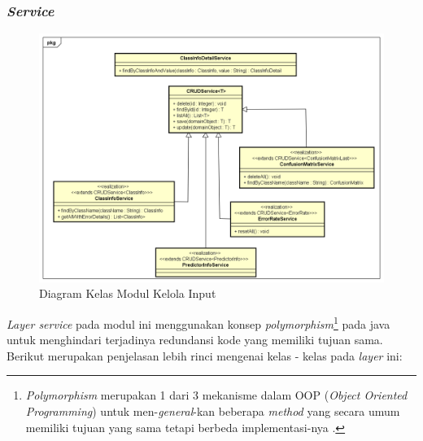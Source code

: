 \subsubsection{\textit{Service}}
\begin{figure}[H]
	\centering
	\includegraphics[scale=0.55]{ClassDiagramLengkap/Klasifikasi/Simple_CD_Klasifikasi_Services}
	\caption[Diagram Kelas Modul Kelola Input]{Diagram Kelas Modul Kelola Input}
	\label{fig:Diagram Kelas Modul Kelola Input}
\end{figure}
\textit{Layer service} pada modul ini menggunakan konsep \textit{polymorphism}\footnote{
\textit{Polymorphism} merupakan 1 dari 3 mekanisme dalam OOP (\textit{Object Oriented Programming}) untuk men-\textit{general}-kan beberapa \textit{method} yang secara umum memiliki tujuan yang sama tetapi berbeda implementasi-nya \cite{AbsoluteJava:2012}.} pada java untuk menghindari terjadinya redundansi kode yang memiliki tujuan sama. Berikut merupakan penjelasan lebih rinci mengenai kelas - kelas pada \textit{layer} ini:

